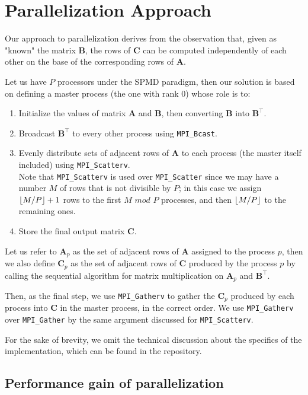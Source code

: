 \section{Parallelization Approach}

Our approach to parallelization derives from the observation that, given as "known" the matrix $\textbf{B}$, the rows of $\textbf{C}$ can be computed independently of each other on the base of the corresponding rows of $\textbf{A}$.

Let us have $P$ processors under the SPMD paradigm, then our solution is based on defining a master process (the one with rank $0$) whose role is to:
\begin{enumerate}
    \item Initialize the values of matrix $\textbf{A}$ and $\textbf{B}$, then converting $\textbf{B}$ into $\textbf{B}^\top$.
    \item Broadcast $\textbf{B}^\top$ to every other process using \texttt{MPI\_Bcast}.
    \item Evenly distribute sets of adjacent rows of $\textbf{A}$ to each process (the master itself included) using \texttt{MPI\_Scatterv}. \\ Note that \texttt{MPI\_Scatterv} is used over \texttt{MPI\_Scatter} since we may have a number $M$ of rows that is not divisible by $P$; in this case we assign $\floor*{M/P} + 1$ rows to the first $M \textit{ mod } P$ processes, and then $\floor*{M/P}$ to the remaining ones.
    \item Store the final output matrix $\textbf{C}$.
\end{enumerate}

Let us refer to $\textbf{A}_p$ as the set of adjacent rows of $\textbf{A}$ assigned to the process $p$, then we also define $\textbf{C}_p$ as the set of adjacent rows of $\textbf{C}$ produced by the process $p$ by calling the sequential algorithm for matrix multiplication on $\textbf{A}_p$ and $\textbf{B}^\top$.

Then, as the final step, we use \texttt{MPI\_Gatherv} to gather the $\textbf{C}_p$ produced by each process into $\textbf{C}$ in the master process, in the correct order. We use \texttt{MPI\_Gatherv} over \texttt{MPI\_Gather} by the same argument discussed for \texttt{MPI\_Scatterv}.

For the sake of brevity, we omit the technical discussion about the specifics of the implementation, which can be found in the repository.

\subsection{Performance gain of parallelization}\label{ssec:pperform}


